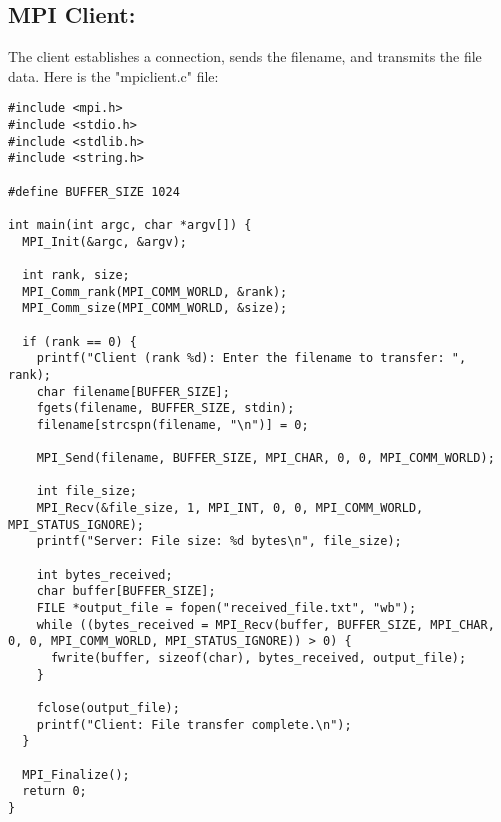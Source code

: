 \documentclass{article}
\begin{document}
\subsection{MPI Client:}
The client establishes a connection, sends the filename, and transmits the file data. Here is the "mpiclient.c" file:
\begin{verbatim}
#include <mpi.h>
#include <stdio.h>
#include <stdlib.h>
#include <string.h>

#define BUFFER_SIZE 1024

int main(int argc, char *argv[]) {
  MPI_Init(&argc, &argv);

  int rank, size;
  MPI_Comm_rank(MPI_COMM_WORLD, &rank);
  MPI_Comm_size(MPI_COMM_WORLD, &size);

  if (rank == 0) {
    printf("Client (rank %d): Enter the filename to transfer: ", rank);
    char filename[BUFFER_SIZE];
    fgets(filename, BUFFER_SIZE, stdin);
    filename[strcspn(filename, "\n")] = 0; 

    MPI_Send(filename, BUFFER_SIZE, MPI_CHAR, 0, 0, MPI_COMM_WORLD);

    int file_size;
    MPI_Recv(&file_size, 1, MPI_INT, 0, 0, MPI_COMM_WORLD, MPI_STATUS_IGNORE);
    printf("Server: File size: %d bytes\n", file_size); 

    int bytes_received;
    char buffer[BUFFER_SIZE];
    FILE *output_file = fopen("received_file.txt", "wb");  
    while ((bytes_received = MPI_Recv(buffer, BUFFER_SIZE, MPI_CHAR, 0, 0, MPI_COMM_WORLD, MPI_STATUS_IGNORE)) > 0) {
      fwrite(buffer, sizeof(char), bytes_received, output_file);
    }

    fclose(output_file);
    printf("Client: File transfer complete.\n");
  }

  MPI_Finalize();
  return 0;
}

\end{verbatim}
\end{document}
